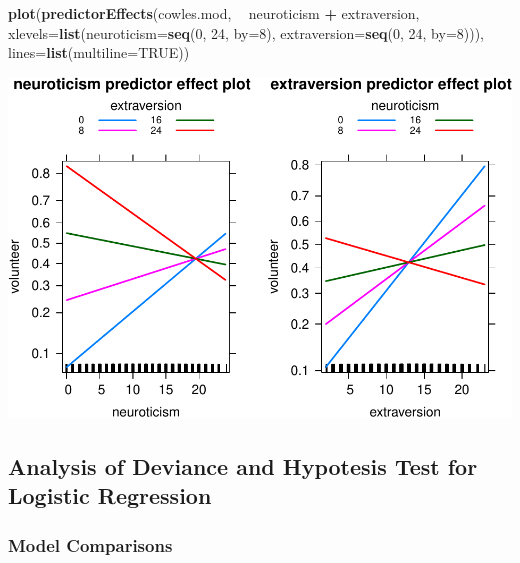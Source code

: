 \documentclass[
]{article}
\newenvironment{Shaded}{\begin{snugshade}}{\end{snugshade}}
\newcommand{\DataTypeTok}[1]{\textcolor[rgb]{0.13,0.29,0.53}{#1}}
\newcommand{\DecValTok}[1]{\textcolor[rgb]{0.00,0.00,0.81}{#1}}
\newcommand{\KeywordTok}[1]{\textcolor[rgb]{0.13,0.29,0.53}{\textbf{#1}}}
\newcommand{\NormalTok}[1]{#1}
\newcommand{\OperatorTok}[1]{\textcolor[rgb]{0.81,0.36,0.00}{\textbf{#1}}}
\newcommand{\OtherTok}[1]{\textcolor[rgb]{0.56,0.35,0.01}{#1}}
\newcommand{\StringTok}[1]{\textcolor[rgb]{0.31,0.60,0.02}{#1}}
\begin{document}
\begin{Shaded}
\begin{Highlighting}[]
\KeywordTok{plot}\NormalTok{(}\KeywordTok{predictorEffects}\NormalTok{(cowles.mod, }\OperatorTok{~}\StringTok{ }\NormalTok{neuroticism }\OperatorTok{+}\StringTok{ }\NormalTok{extraversion,}
    \DataTypeTok{xlevels=}\KeywordTok{list}\NormalTok{(}\DataTypeTok{neuroticism=}\KeywordTok{seq}\NormalTok{(}\DecValTok{0}\NormalTok{, }\DecValTok{24}\NormalTok{, }\DataTypeTok{by=}\DecValTok{8}\NormalTok{), }
        \DataTypeTok{extraversion=}\KeywordTok{seq}\NormalTok{(}\DecValTok{0}\NormalTok{, }\DecValTok{24}\NormalTok{, }\DataTypeTok{by=}\DecValTok{8}\NormalTok{))), }
    \DataTypeTok{lines=}\KeywordTok{list}\NormalTok{(}\DataTypeTok{multiline=}\OtherTok{TRUE}\NormalTok{))}
\end{Highlighting}
\end{Shaded}

\includegraphics{LogisticRegressCh6_files/figure-latex/unnamed-chunk-5-2.pdf}

\hypertarget{analysis-of-deviance-and-hypotesis-test-for-logistic-regression}{%
\subsection{Analysis of Deviance and Hypotesis Test for Logistic
Regression}\label{analysis-of-deviance-and-hypotesis-test-for-logistic-regression}}

\hypertarget{model-comparisons}{%
\subsubsection{Model Comparisons}\label{model-comparisons}}
\end{document}
